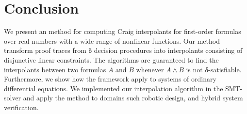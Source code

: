 \section{Conclusion}
\label{sec:concl}

We present an method for computing Craig interpolants for first-order formulas over real numbers with a wide range of nonlinear functions.
Our method transform proof traces from δ decision procedures into interpolants consisting of disjunctive linear constraints.
The algorithms are guaranteed to find the interpolants between two formulas $A$ and $B$ whenever $A ∧ B$ is not δ-satisfiable.
Furthermore, we show how the framework apply to systems of ordinary differential equations.
We implemented our interpolation algorithm in the \dReal SMT-solver and apply the method to domains such robotic design, and hybrid system verification.  

